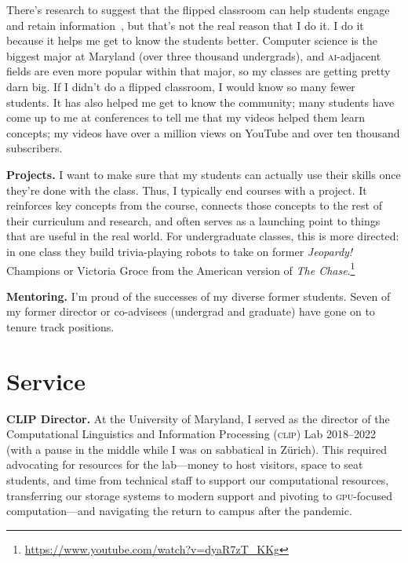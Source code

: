 \documentclass[11pt]{amsart}
\newcommand{\abr}[1]{\textsc{#1}}
\begin{document}
%

There's research to suggest that the flipped classroom can help
students engage and retain information~\cite{Zuber-16}, but that's not
the real reason that I do it.
%
I do it because it helps me get to know the students better.  Computer
science is the biggest major at Maryland (over three thousand undergrads), and
\abr{ai}-adjacent fields are even more popular within that major, so my
classes are getting pretty darn big.
%
If I didn't do a flipped
classroom, I would know so many fewer students.
%
It has also helped me get to know the community; many students have come up to me at conferences to tell me that my videos helped them learn concepts; my videos have over a million views on YouTube and over ten thousand subscribers.

{\bf Projects.}
%
I want to make sure that my students can actually use their skills
once they're done with the class.  Thus, I typically end courses with
a project.  It reinforces key concepts from the course, connects those
concepts to the rest of their curriculum and research, and often
serves as a launching point to things that are useful in the real
world.  For undergraduate classes, this is more directed: in one class
they build trivia-playing robots to take on former \textit{Jeopardy!} Champions
or Victoria Groce from the American version of \textit{The
  Chase}.\footnote{\href{https://www.youtube.com/watch?v=dyaR7zT_KKg}{https://www.youtube.com/watch?v=dyaR7zT\_KKg}}

{\bf Mentoring.}
%
I'm proud of the successes of my diverse former students.
%
Seven of my former director or co-advisees (undergrad and graduate) have gone on to tenure track positions.

\section{Service}

{\bf CLIP Director.}
At the University of Maryland, I served as the director of the
Computational Linguistics and Information Processing (\abr{clip}) Lab
2018--2022 (with a pause in the middle while I was on sabbatical in
Z\"urich).
%
This required advocating for resources for the lab---money to host visitors, space to seat students, and time from technical staff to support our computational resources, transferring our storage systems to modern support and pivoting to \abr{gpu}-focused computation---and navigating the return to campus after the pandemic.
\end{document}
